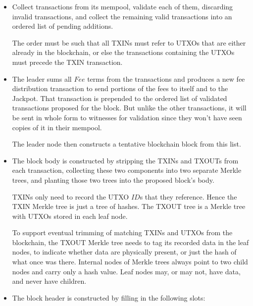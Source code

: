 \documentclass[a4paper, 10pt, conference]{ieeeconf}
\begin{document}
\begin{itemize}
	\item {Collect transactions from its mempool, validate each of them, discarding invalid transactions, and collect the remaining valid transactions into an ordered list of pending additions.

	The order must be such that all TXINs must refer to UTXOs that are either already in the blockchain, or else the transactions containing the UTXOs must precede the TXIN transaction.}
	\item {The leader sums all $Fee$ terms from the transactions and produces a new fee distribution transaction to send portions of the fees to itself and to the Jackpot. That transaction is prepended to the ordered list of validated transactions proposed for the block. But unlike the other transactions, it will be sent in whole form to witnesses for validation since they won't have seen copies of it in their mempool.

	The leader node then constructs a tentative blockchain block from this list.}
	\item {The block body is constructed by stripping the TXINs and TXOUTs from each transaction, collecting these two components into two separate Merkle trees, and planting those two trees into the proposed block's body.

	TXINs only need to record the UTXO $ID$s that they reference. Hence the TXIN Merkle tree is just a tree of hashes. The TXOUT tree is a Merkle tree with UTXOs stored in each leaf node.

	To support eventual trimming of matching TXINs and UTXOs from the blockchain, the TXOUT Merkle tree needs to tag its recorded data in the leaf nodes, to indicate whether data are physically present, or just the hash of what once was there. Internal nodes of Merkle trees always point to two child nodes and carry only a hash value. Leaf nodes may, or may not, have data, and never have children.}
	\item {The block header is constructed by filling in the following slots:

}
\end{itemize}
\end{document}

